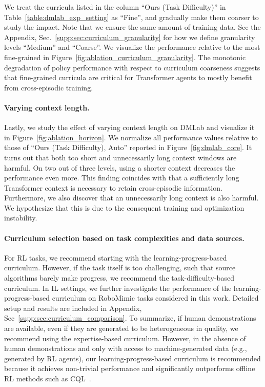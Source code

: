 \documentclass{article}
\newcommand{\para}[1]{\paragraph{#1}\looseness=-1}
\begin{document}
We treat the curricula listed in the column ``Ours (Task Difficulty)'' in Table~\ref{table:dmlab_exp_setting} as ``Fine'', and gradually make them coarser to study the impact.
Note that we ensure the same amount of training data.
See the Appendix, Sec.~\ref{supp:sec:curriculum_granularity} for how we define granularity levels ``Medium'' and ``Coarse''.
We visualize the performance relative to the most fine-grained in Figure~\ref{fig:ablation_curriculum_granularity}.
The monotonic degradation of policy performance with respect to curriculum coarseness suggests that fine-grained curricula are critical for Transformer agents to mostly benefit from cross-episodic training.

\vspace{-0.5em}
\para{Varying context length.}
Lastly, we study the effect of varying context length on DMLab and visualize it in Figure~\ref{fig:ablation_horizon}.
We normalize all performance values relative to those of ``Ours (Task Difficulty), Auto'' reported in Figure~\ref{fig:dmlab_core}.
It turns out that both too short and unnecessarily long context windows are harmful.
On two out of three levels, using a shorter context decreases the performance even more.
This finding coincides with \citet{laskin2023incontext} that a sufficiently long Transformer context is necessary to retain cross-episodic information.
Furthermore, we also discover that an unnecessarily long context is also harmful.
We hypothesize that this is due to the consequent training and optimization instability.
\para{Curriculum selection based on task complexities and data sources.}
For RL tasks, we recommend starting with the learning-progress-based curriculum. However, if the task itself is too challenging, such that source algorithms barely make progress, we recommend the task-difficulty-based curriculum.
In IL settings, we further investigate the performance of the learning-progress-based curriculum on RoboMimic tasks considered in this work. Detailed setup and results are included in Appendix, Sec~\ref{supp:sec:curriculum_comparison}. To summarize, if human demonstrations are available, even if they are generated to be heterogeneous in quality, we recommend using the expertise-based curriculum. However, in the absence of human demonstrations and only with access to machine-generated data (e.g., generated by RL agents), our learning-progress-based curriculum is recommended because it achieves non-trivial performance and significantly outperforms offline RL methods such as CQL~\citep{kumar2020conservative}.
\end{document}
